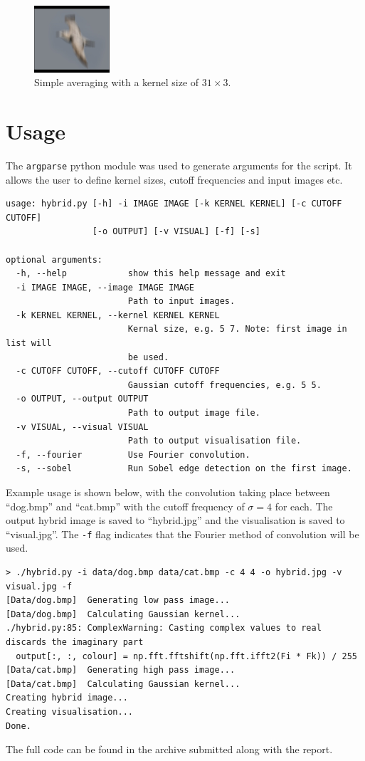 \documentclass[a4paper]{article}
\begin{document}
\begin{figure}[!htbp]
    \centering
    \includegraphics[width=0.25\textwidth]{../arb}
    \caption{Simple averaging with a kernel size of $31\times 3$.}
    \label{fig:arb-kern}
\end{figure}

\section{Usage}
The \texttt{argparse} python module was used to generate arguments for the script. It allows the user to define kernel sizes, cutoff frequencies and input images etc.

\begin{verbatim}
usage: hybrid.py [-h] -i IMAGE IMAGE [-k KERNEL KERNEL] [-c CUTOFF CUTOFF]
                 [-o OUTPUT] [-v VISUAL] [-f] [-s]

optional arguments:
  -h, --help            show this help message and exit
  -i IMAGE IMAGE, --image IMAGE IMAGE
                        Path to input images.
  -k KERNEL KERNEL, --kernel KERNEL KERNEL
                        Kernal size, e.g. 5 7. Note: first image in list will
                        be used.
  -c CUTOFF CUTOFF, --cutoff CUTOFF CUTOFF
                        Gaussian cutoff frequencies, e.g. 5 5.
  -o OUTPUT, --output OUTPUT
                        Path to output image file.
  -v VISUAL, --visual VISUAL
                        Path to output visualisation file.
  -f, --fourier         Use Fourier convolution.
  -s, --sobel           Run Sobel edge detection on the first image.
\end{verbatim}

Example usage is shown below, with the convolution taking place between ``dog.bmp'' and ``cat.bmp'' with the cutoff frequency of $\sigma=4$ for each. The output hybrid image is saved to ``hybrid.jpg'' and the visualisation is saved to ``visual.jpg''. The \texttt{-f} flag indicates that the Fourier method of convolution will be used.

\begin{verbatim}
> ./hybrid.py -i data/dog.bmp data/cat.bmp -c 4 4 -o hybrid.jpg -v visual.jpg -f
[Data/dog.bmp]	Generating low pass image...
[Data/dog.bmp]	Calculating Gaussian kernel...
./hybrid.py:85: ComplexWarning: Casting complex values to real discards the imaginary part
  output[:, :, colour] = np.fft.fftshift(np.fft.ifft2(Fi * Fk)) / 255
[Data/cat.bmp]	Generating high pass image...
[Data/cat.bmp]	Calculating Gaussian kernel...
Creating hybrid image...
Creating visualisation...
Done.
\end{verbatim}

The full code can be found in the archive submitted along with the report.
\end{document}
